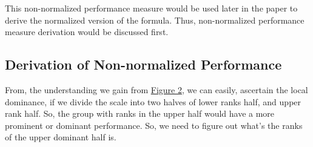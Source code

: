 \documentclass[a4paper,fleqn,review]{cas-sc}
\begin{document}
This non-normalized performance measure would be used later in the paper to derive the normalized version of the formula. Thus, non-normalized performance measure derivation would be discussed first.


\subsection{Derivation of Non-normalized Performance}

From, the understanding we gain from \hyperref[fig:dominance_Understanding]{Figure 2}, we can easily, ascertain the local dominance, if we divide the scale into two halves of lower ranks half, and upper rank half. So, the group with ranks in the upper half would have a more prominent or dominant performance. So, we need to figure out what's the ranks of the upper dominant half is.
\end{document}
